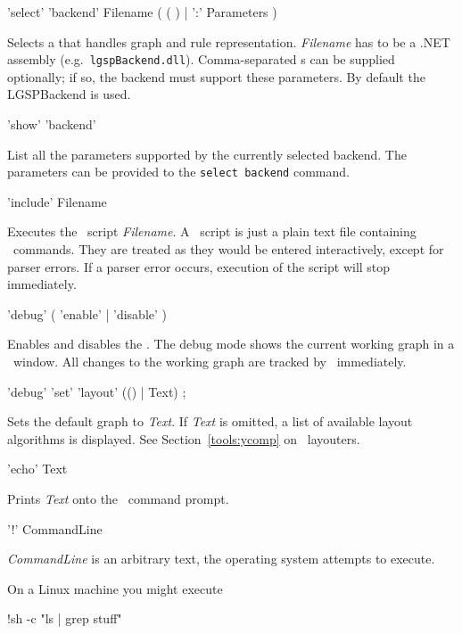 \begin{rail}
  'select' 'backend' Filename ( ( ) | ':' Parameters )
\end{rail}
Selects a  that handles graph and rule representation. \emph{Filename} has to be a .NET assembly (e.g.\ \texttt{lgspBackend.dll}).
Comma-separated s can be supplied optionally; if so, the backend must support these parameters.
By default the LGSPBackend is used.

\begin{rail}
  'show' 'backend'
\end{rail}\nopagebreak{}
List all the parameters supported by the currently selected backend. The parameters can be provided to the \texttt{select backend} command.

\begin{rail}
  'include' Filename
\end{rail}
Executes the \GrShell\ script \emph{Filename}. A \GrShell\ script is just a plain text file containing \GrShell\ commands. They are treated as they would be entered interactively, except for parser errors. If a parser error occurs, execution of the script will stop immediately.

\begin{rail}
  'debug' ( 'enable' | 'disable' )
\end{rail}
Enables and disables the . The debug mode shows the current working graph in a \yComp\ window. All changes to the working graph are tracked by \yComp\ immediately.  

\begin{rail}
  'debug' 'set' 'layout' (() | Text) ;
\end{rail}
Sets the default graph  to \emph{Text}. If \emph{Text} is omitted, a list of available layout algorithms is displayed. See Section~\ref{tools:ycomp} on \yComp\ layouters.

\begin{rail}
  'echo' Text
\end{rail}
Prints \emph{Text} onto the \GrShell\ command prompt.

\begin{rail}
  '!' CommandLine
\end{rail}
\emph{CommandLine} is an arbitrary text, the operating system attempts to execute.
\begin{example}
On a Linux machine you might execute
\begin{grshell}
!sh -c "ls | grep stuff"
\end{grshell}
\end{example}

